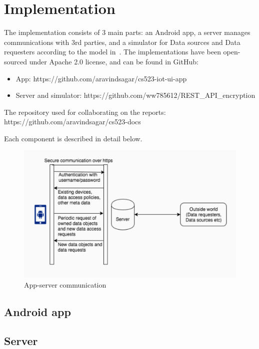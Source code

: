 \documentclass[conference]{IEEEtran}
\begin{document}
\section{Implementation}
The implementation consists of 3 main parts: an Android app, a server manages communications with 3rd parties, and a simulator for Data sources and Data requesters according to the model in~\cite{campbell}. The implementations have been open-sourced under Apache 2.0 license, and can be found in GitHub:
\begin{itemize}
	\item App: https://github.com/\linebreak[0]aravindsagar/\linebreak[0]cs523-iot-ui-app
	\item Server and simulator: https://github.com/\linebreak[0]ww785612/\linebreak[0]REST\_API\_encryption
\end{itemize}

The repository used for collaborating on the reports: https://github.com/\linebreak[0]aravindsagar/\linebreak[0]cs523-docs

Each component is described in detail below.

\begin{figure}[t]
	\includegraphics[width=0.95\linewidth]{app_server.png}
	\caption{App-server communication}
	\label{fig:app_server_comm}
\end{figure}
\subsection{Android app}

\subsection{Server}

\end{document}
